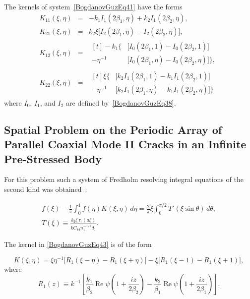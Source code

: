 The kernels of system~\eqref{BogdanovGuzEq41} have the forms
\begin{equation}\label{BogdanovGuzEq42}
	\begin{array}{rcl}
		K_{11}(\xi,\eta)&=&-k_1 I_1(2\beta_1,\eta)+k_2 I_1(2\beta_2,\eta), 
		\\[4pt]
		K_{21}(\xi,\eta)&=&k_2\xi
		\big[I_2(2\beta_1,\eta)-I_2(2\beta_2,\eta)\big], 
		\\[4pt]
		K_{12}(\xi,\eta)
		&=&
		\begin{aligned}[t]
			-k_1\!\big\{
			&\big[I_0(2\beta_1,1)-I_0(2\beta_2,1)\big]
			\\
			-\eta^{-1}&\big[I_0(2\beta_1,\eta)-I_0(2\beta_2,\eta)\big]
			\big\}, 
		\end{aligned}
		\\[2em]
		K_{22}(\xi,\eta)
		&=&
		\begin{aligned}[t]
			\xi\!\big\{
			&\big[k_2 I_1(2\beta_1,1)-k_1 I_1(2\beta_2,1)\big]
			\\
			-\eta^{-1}&\big[k_2 I_1(2\beta_1,\eta)-k_1 I_1(2\beta_2,\eta)\big]
			\big\}
		\end{aligned}
	\end{array}
\end{equation}
%
where $I_0$, $I_1$, and $I_2$ are defined by~\eqref{BogdanovGuzEq38}.

\subsection{Spatial Problem on the Periodic Array of Parallel Coaxial Mode II Cracks in an Infinite Pre-Stressed Body}

For this problem such a system of Fredholm resolving integral equations of the second kind was obtained~\cite{BogdanovGuz32}:

\begin{equation}\label{BogdanovGuzEq43}
	\begin{aligned}
	f(\xi)-\frac{1}{\pi}\int_{0}^{1}f(\eta)K(\xi,\eta)\,d\eta
	=\frac{2}{\pi}\xi\int_{0}^{\pi/2}T'(\xi\sin\theta)\,d\theta,
	\\
	T(\xi)\equiv
	\frac{k_{2}\xi\,\tau_r(a\xi)}{kC_{44}n_1^{-1/2}d_{1}} .
	\end{aligned}
\end{equation}

The kernel in \eqref{BogdanovGuzEq43} is of the form

\begin{equation}\label{BogdanovGuzEq44}
	K(\xi,\eta)
	=\xi\eta^{-1}\big[R_{1}(\xi-\eta)-R_{1}(\xi+\eta)\big]
	-\xi\big[R_{1}(\xi-1)-R_{1}(\xi+1)\big],
\end{equation}
%
where
\[
R_{1}(z)\equiv
k^{-1}\left[
\frac{k_{1}}{\beta_{2}}\operatorname{Re}\psi\!\left(1+\frac{iz}{2\beta_{2}}\right)
-\frac{k_{2}}{\beta_{1}}\operatorname{Re}\psi\!\left(1+\frac{iz}{2\beta_{1}}\right)
\right].
\]

